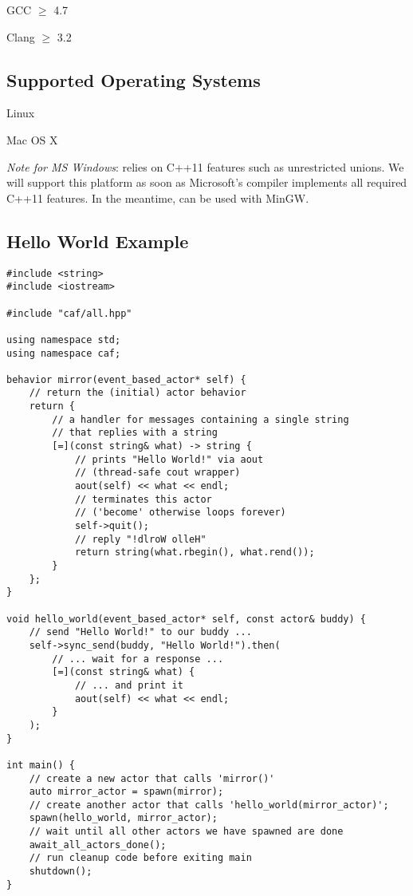 \begin{itemize*}
  \item GCC $\ge$ 4.7
  \item Clang $\ge$ 3.2
\end{itemize*}

\subsection{Supported Operating Systems}

\begin{itemize*}
\item Linux
\item Mac OS X
\item \textit{Note for MS Windows}:
\lib relies on C++11 features such as unrestricted unions.
We will support this platform as soon as Microsoft's compiler implements all required C++11 features.
In the meantime, \lib can be used with MinGW.
\end{itemize*}

\clearpage
\subsection{Hello World Example}

\begin{lstlisting}
#include <string>
#include <iostream>

#include "caf/all.hpp"

using namespace std;
using namespace caf;

behavior mirror(event_based_actor* self) {
    // return the (initial) actor behavior
    return {
        // a handler for messages containing a single string
        // that replies with a string
        [=](const string& what) -> string {
            // prints "Hello World!" via aout
            // (thread-safe cout wrapper)
            aout(self) << what << endl;
            // terminates this actor
            // ('become' otherwise loops forever)
            self->quit();
            // reply "!dlroW olleH"
            return string(what.rbegin(), what.rend());
        }
    };
}

void hello_world(event_based_actor* self, const actor& buddy) {
    // send "Hello World!" to our buddy ...
    self->sync_send(buddy, "Hello World!").then(
        // ... wait for a response ...
        [=](const string& what) {
            // ... and print it
            aout(self) << what << endl;
        }
    );
}

int main() {
    // create a new actor that calls 'mirror()'
    auto mirror_actor = spawn(mirror);
    // create another actor that calls 'hello_world(mirror_actor)';
    spawn(hello_world, mirror_actor);
    // wait until all other actors we have spawned are done
    await_all_actors_done();
    // run cleanup code before exiting main
    shutdown();
}
\end{lstlisting}
